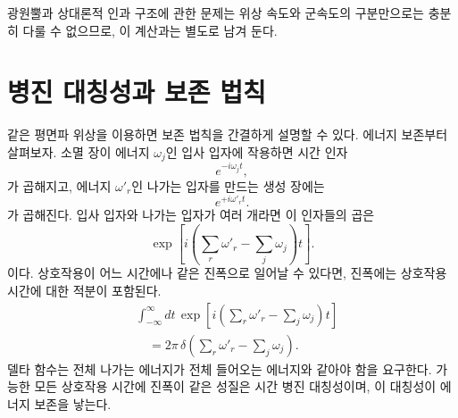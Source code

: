 광원뿔과 상대론적 인과 구조에 관한 문제는 위상 속도와 군속도의 구분만으로는 충분히 다룰 수 없으므로, 이 계산과는 별도로 남겨 둔다.

\section{병진 대칭성과 보존 법칙}

같은 평면파 위상을 이용하면 보존 법칙을 간결하게 설명할 수 있다. 에너지 보존부터 살펴보자. 소멸 장이 에너지 \(\omega_j\)인 입사 입자에 작용하면 시간 인자
\begin{equation}
e^{-i\omega_j t},
\end{equation}
가 곱해지고, 에너지 \(\omega'_r\)인 나가는 입자를 만드는 생성 장에는
\begin{equation}
e^{+i\omega'_r t}.
\end{equation}
가 곱해진다. 입사 입자와 나가는 입자가 여러 개라면 이 인자들의 곱은
\begin{equation}
\exp\!\left[
i\left(\sum_r\omega'_r-\sum_j\omega_j\right)t
\right].
\end{equation}
이다. 상호작용이 어느 시간에나 같은 진폭으로 일어날 수 있다면, 진폭에는 상호작용 시간에 대한 적분이 포함된다.
\begin{equation}
\begin{aligned}
&\int_{-\infty}^{\infty}dt\,
\exp\!\left[
i\left(\sum_r\omega'_r-\sum_j\omega_j\right)t
\right]
\\
&\quad =2\pi\,
\delta\!\left(\sum_r\omega'_r-\sum_j\omega_j\right).
\end{aligned}
\end{equation}
델타 함수는 전체 나가는 에너지가 전체 들어오는 에너지와 같아야 함을 요구한다. 가능한 모든 상호작용 시간에 진폭이 같은 성질은 시간 병진 대칭성이며, 이 대칭성이 에너지 보존을 낳는다.

